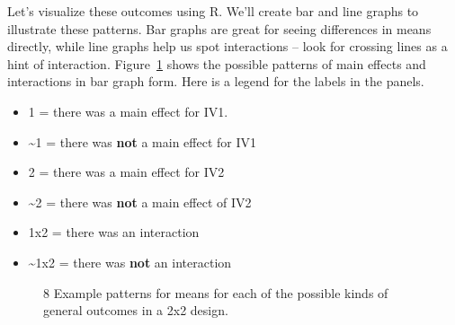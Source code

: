 \documentclass[
  letterpaper,
  DIV=11,
  numbers=noendperiod]{scrreprt}
\providecommand{\tightlist}{%
  \setlength{\itemsep}{0pt}\setlength{\parskip}{0pt}}\usepackage{longtable,booktabs,array}
\begin{document}
Let's visualize these outcomes using R. We'll create bar and line graphs
to illustrate these patterns. Bar graphs are great for seeing
differences in means directly, while line graphs help us spot
interactions -- look for crossing lines as a hint of interaction.
Figure~\ref{fig-11bar22} shows the possible patterns of main effects and
interactions in bar graph form. Here is a legend for the labels in the
panels.

\begin{itemize}
\tightlist
\item
  1 = there was a main effect for IV1.
\item
  \textasciitilde1 = there was \textbf{not} a main effect for IV1
\item
  2 = there was a main effect for IV2
\item
  \textasciitilde2 = there was \textbf{not} a main effect of IV2
\item
  1x2 = there was an interaction
\item
  \textasciitilde1x2 = there was \textbf{not} an interaction
\end{itemize}

\begin{figure}


\caption{\label{fig-11bar22}8 Example patterns for means for each of the
possible kinds of general outcomes in a 2x2 design.}

\end{figure}%
\end{document}
